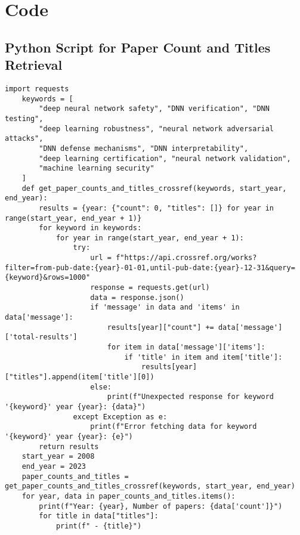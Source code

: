    \chapter{Code}
   \label{code}
   \begin{appendix}
    \section{Python Script for Paper Count and Titles Retrieval}
    \begin{lstlisting}[caption={Python script to retrieve paper counts and titles using CrossRef API}, label={lst:crossref_script}]
    import requests 
    keywords = [
        "deep neural network safety", "DNN verification", "DNN testing",
        "deep learning robustness", "neural network adversarial attacks",
        "DNN defense mechanisms", "DNN interpretability",
        "deep learning certification", "neural network validation",
        "machine learning security"
    ]
    def get_paper_counts_and_titles_crossref(keywords, start_year, end_year):
        results = {year: {"count": 0, "titles": []} for year in range(start_year, end_year + 1)}
        for keyword in keywords:
            for year in range(start_year, end_year + 1):
                try:
                    url = f"https://api.crossref.org/works?filter=from-pub-date:{year}-01-01,until-pub-date:{year}-12-31&query={keyword}&rows=1000"
                    response = requests.get(url)
                    data = response.json()
                    if 'message' in data and 'items' in data['message']:
                        results[year]["count"] += data['message']['total-results']
                        for item in data['message']['items']:
                            if 'title' in item and item['title']:
                                results[year]["titles"].append(item['title'][0])
                    else:
                        print(f"Unexpected response for keyword '{keyword}' year {year}: {data}")
                except Exception as e:
                    print(f"Error fetching data for keyword '{keyword}' year {year}: {e}")
        return results
    start_year = 2008
    end_year = 2023
    paper_counts_and_titles = get_paper_counts_and_titles_crossref(keywords, start_year, end_year) 
    for year, data in paper_counts_and_titles.items():
        print(f"Year: {year}, Number of papers: {data['count']}")
        for title in data["titles"]:
            print(f" - {title}")

    \end{lstlisting}
    \end{appendix}